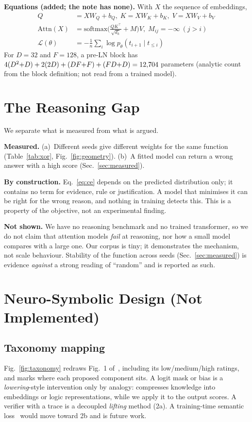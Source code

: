 \documentclass[conference]{IEEEtran}
\begin{document}
\textbf{Equations (added; the note has none).} With $X$ the sequence of embeddings,
\begin{align}
Q&=XW_Q+b_Q,\; K=XW_K+b_K,\; V=XW_V+b_V \label{eq:qkv}\\
\mathrm{Attn}(X)&=\mathrm{softmax}\!\Big(\tfrac{QK^{\top}}{\sqrt{d_k}}+M\Big)V,\; M_{ij}=-\infty\ (j>i) \label{eq:attn}\\
\mathcal L(\theta)&=-\tfrac1n\textstyle\sum_{i}\log p_\theta(t_{i+1}\mid t_{\le i}) \label{eq:ce}
\end{align}
For $D=32$ and $F=128$, a pre-LN block has $4(D^2{+}D)+2(2D)+(DF{+}F)+(FD{+}D)=12{,}704$ parameters (analytic count from the block definition; not read from a trained model).

\section{The Reasoning Gap}\label{sec:gap}
We separate what is measured from what is argued.

\textbf{Measured.} (a)~Different seeds give different weights for the same function (Table~\ref{tab:xor}, Fig.~\ref{fig:geometry}). (b)~A fitted model can return a wrong answer with a high score (Sec.~\ref{sec:measured}).

\textbf{By construction.} Eq.~\eqref{eq:ce} depends on the predicted distribution only; it contains no term for evidence, rule or justification. A model that minimises it can be right for the wrong reason, and nothing in training detects this. This is a property of the objective, not an experimental finding.

\textbf{Not shown.} We have no reasoning benchmark and no trained transformer, so we do not claim that attention models \emph{fail} at reasoning, nor how a small model compares with a large one. Our corpus is tiny; it demonstrates the mechanism, not scale behaviour. Stability of the function across seeds (Sec.~\ref{sec:measured}) is evidence \emph{against} a strong reading of ``random'' and is reported as such.

\section{Neuro-Symbolic Design (Not Implemented)}\label{sec:ns}
\subsection{Taxonomy mapping}
Fig.~\ref{fig:taxonomy} redraws Fig.~1 of~\cite{sheth2023}, including its low/medium/high ratings, and marks where each proposed component sits. A logit mask or bias is a \emph{lowering}-style intervention only by analogy: \cite{sheth2023} compresses knowledge into embeddings or logic representations, while we apply it to the output scores. A verifier with a trace is a decoupled \emph{lifting} method (2a). A training-time semantic loss~\cite{xu2018} would move toward 2b and is future work.
\end{document}
